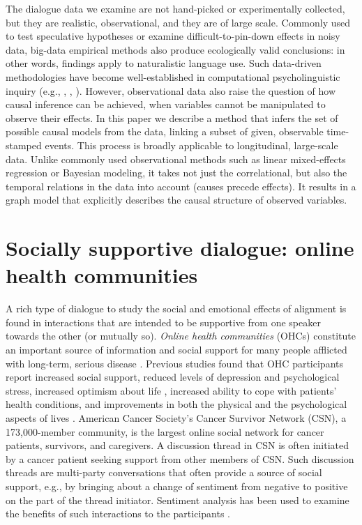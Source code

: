 The dialogue data we examine are not hand-picked or experimentally collected, but they are realistic, observational, and they are of large scale.  Commonly used to test speculative hypotheses or examine difficult-to-pin-down effects in noisy data, big-data empirical methods also produce ecologically valid conclusions: in other words, findings apply to naturalistic language use.  Such data-driven methodologies have become well-established in computational psycholinguistic inquiry (e.g., \cite{gries2005corpusbased}, \cite{jaeger2006speakers}, \cite{reitter2017alignment}).  However, observational data also raise the question of how causal inference can be achieved, when variables cannot be manipulated to observe their effects. In this paper we describe a method that infers  the set of possible causal models from the data, linking a subset of given, observable time-stamped events.    This process is broadly applicable to longitudinal, large-scale data.  Unlike commonly used observational methods such as linear mixed-effects regression or Bayesian modeling, it takes not just the correlational, but also the temporal relations in the data into account (causes precede effects).   It results in a graph model that explicitly describes the causal structure of observed variables.


\section{Socially supportive dialogue: online health communities}

A rich type of dialogue to study the social and emotional effects of alignment is found in interactions that are intended to be supportive from one speaker towards the other (or mutually so).
\emph{Online health communities} (OHCs) constitute an important source of information and social support for many people afflicted with long-term, serious disease \parencite{dunkel1984social}. Previous studies found that OHC participants report increased social support, reduced levels of depression and psychological stress, increased optimism about life \parencite{rodgers2005internet}, increased ability to cope with patients' health conditions, and improvements in both the physical and the psychological aspects of lives \parencite{dunkel1984social,rodgers2005internet, maloney2005multilevel,beaudoin2008modeling,bouma2015internet}. American Cancer Society's Cancer Survivor Network (CSN), a 173,000-member community, is the largest online social network for cancer patients, survivors, and caregivers. A discussion thread in CSN is often initiated by a cancer patient seeking support from other members of CSN. Such discussion threads are multi-party conversations that often provide a source of social support, e.g., by bringing about a change of sentiment from negative to positive on the part of the thread initiator. Sentiment analysis has been used to examine the benefits of such interactions to the participants \parencite{qiu2011get,huh2013text,portier2013understanding}.

